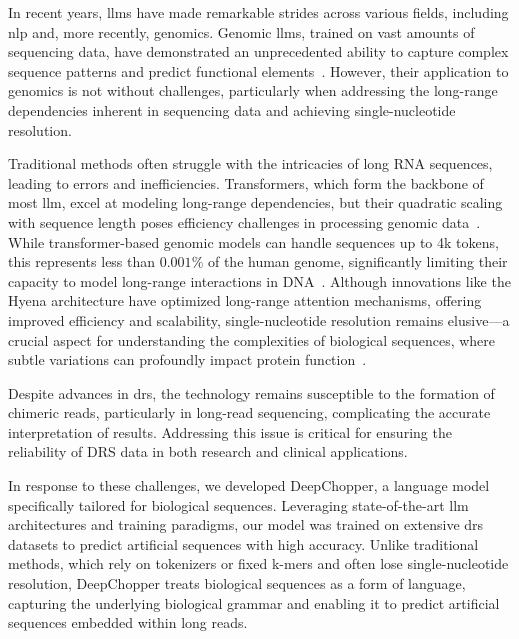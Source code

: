 \documentclass[pdflatex, sn-mathphys-num, lineno]{sn-jnl}%
\newcommand{\chopper}{DeepChopper\xspace}
\theoremstyle{thmstyleone}%
\theoremstyle{thmstyletwo}%
\theoremstyle{thmstylethree}%
\begin{document}
In recent years, \glspl{llm} have made remarkable strides across various fields, including \gls{nlp} and, more recently, genomics.
Genomic \glspl{llm}, trained on vast amounts of sequencing data, have demonstrated an unprecedented ability to capture complex sequence patterns and predict functional elements~\cite{nguyen2024hyenadna, dalla2023nucleotide, zhou2023dnabert2}.
However, their application to genomics is not without challenges, particularly when addressing the long-range dependencies inherent in sequencing data and achieving single-nucleotide resolution.


Traditional methods  often struggle with the intricacies of long RNA sequences, leading to errors and inefficiencies.
Transformers, which form the backbone of most \gls{llm}, excel at modeling long-range dependencies, but their quadratic scaling with sequence length poses efficiency challenges in processing genomic data~\cite{tay2022efficient}.
While transformer-based genomic models can handle sequences up to 4k tokens, this represents less than $0.001\%$ of the human genome, significantly limiting their capacity to model long-range interactions in DNA~\cite{dalla2023nucleotide, zhou2023dnabert2, ji2021dnabert}.
Although innovations like the Hyena architecture have optimized long-range attention mechanisms, offering improved efficiency and scalability, single-nucleotide resolution remains elusive—a crucial aspect for understanding the complexities of biological sequences, where subtle variations can profoundly impact protein function~\cite{poli2023hyena, nguyen2024hyenadna}.

Despite advances in \gls{drs}, the technology remains susceptible to the formation of chimeric reads, particularly in long-read sequencing, complicating the accurate interpretation of results.
Addressing this issue is critical for ensuring the reliability of DRS data in both research and clinical applications.

In response to these challenges, we developed \chopper, a language model specifically tailored for biological sequences.
Leveraging state-of-the-art \gls{llm} architectures and training paradigms, our model was trained on extensive \gls{drs} datasets to predict artificial sequences with high accuracy.
Unlike traditional methods, which rely on tokenizers or fixed k-mers and often lose single-nucleotide resolution, \chopper treats biological sequences as a form of language, capturing the underlying biological grammar and enabling it to predict artificial sequences embedded within long reads.
\end{document}
